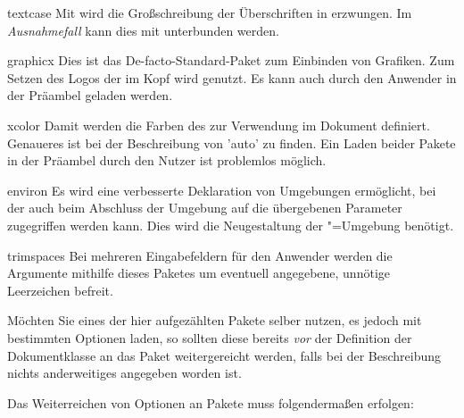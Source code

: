 \begin{packages}
\item[textcase]%
  Mit  wird die Großschreibung der Überschriften in 
  \DIN erzwungen. Im \emph{Ausnahmefall} kann dies mit  
  unterbunden werden.
\item[graphicx]%
  Dies ist das De-facto-Standard-Paket zum Einbinden von Grafiken. Zum Setzen 
  des Logos der \TnUD im Kopf wird  genutzt. Es kann 
  auch durch den Anwender in der Präambel geladen werden.
\item[xcolor]%
  Damit werden die Farben des \CDs zur Verwendung im Dokument definiert. 
  Genaueres ist bei der Beschreibung von 'auto' zu finden. 
  Ein Laden beider Pakete in der  Präambel durch den Nutzer ist problemlos 
  möglich.
\item[environ]%
  Es wird eine verbesserte Deklaration von Umgebungen ermöglicht, bei der auch 
  beim Abschluss der Umgebung auf die übergebenen Parameter zugegriffen werden 
  kann. Dies wird die Neugestaltung der "=Umgebung 
  benötigt.
\item[trimspaces]
  Bei mehreren Eingabefeldern für den Anwender werden die Argumente mithilfe 
  dieses Paketes um eventuell angegebene, unnötige Leerzeichen befreit.
\end{packages}
%
Möchten Sie eines der hier aufgezählten Pakete selber nutzen, es jedoch mit 
bestimmten Optionen laden, so sollten diese bereits \emph{vor} der Definition 
der Dokumentklasse an das Paket weitergereicht werden, falls bei der 
Beschreibung nichts anderweitiges angegeben worden ist.
%
\begin{Example}
Das Weiterreichen von Optionen an Pakete muss folgendermaßen erfolgen:
\end{Example}



